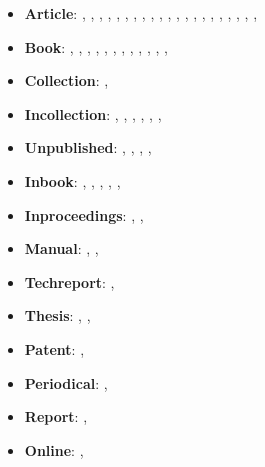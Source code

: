 \begin{itemize}
 \item \textbf{Article}: 
       \cite{brezis93:_leap},
       \cite{ishikawa94:cje},
       \cite{Biker-2007-unemployment},
       \cite{takeda12:cce},
       \cite{takeda07:jjie},
       \cite{yamazaki13:_japan},
       \cite{takeda10:irae},
       \cite{babiker05:ej},
       \cite{yamasue09:mt},
       \cite{yamasue07:mt},
       \cite{babiker00:ep},
       \cite{parry97:ree},
       \cite{takeda19:ere},
       \cite{takeda14:eeps},
       \cite{imbens19:reas},
       \cite{attwood06:_sexed_up},
       \cite{aksin20063027},
       \cite{baez/article},
       \cite{bohringer07:ecoe},
       \cite{bohringer06:ecoe},
       \cite{krugman79:jie},
 \item \textbf{Book}:
       \cite{krugman91:_geog},
       \cite{helpman91:_int},
       \cite{fujita99:_spatial},
       \cite{ryza15:_advan},
       \cite{pearl2009Causality},
       \cite{attwood09:_mains_sex},
       \cite{attwood10:_porn},
       \cite{jones84:_hb_int},
       \cite{jones85:_hb_int},
       \cite{jones97:_hb_int},
       \cite{aristotle:poetics},
       \cite{aristotle:physics},
       \cite{aristotle:anima}
 \item \textbf{Collection}:
       \cite{westfahl:frontier},
 \item \textbf{Incollection}:
       \cite{krugman91:_bila},
       \cite{lucas76:_critique},
       \cite{DeGorter2002},
       \cite{balistreri20131513},
       \cite{westfahl:space},
       \cite{Mcconnell2005},
 \item \textbf{Unpublished}:
       \cite{ishikawa03:_ghg},
       \cite{rutherford00:_gtap},
       \cite{takeda15:_lab},
       \cite{babiker99:_kyoto},
 \item \textbf{Inbook}:
       \cite{wong95:_int},
       \cite{milne-thomson68:_theor},
       \cite{kant:kpv},
       \cite{kant:ku},
       \cite{nietzsche:historie},
 \item \textbf{Inproceedings}:
       \cite{wang89:_model},
       \cite{zhang2016Deep},
 \item \textbf{Manual}:
       \cite{brooke03:_gams},
       \cite{cms},
 \item \textbf{Techreport}:
       \cite{Peri2007},
 \item \textbf{Thesis}:
       \cite{krugman77:_essay},
       \cite{loh},
 \item \textbf{Patent}:
       \cite{sorace},
 \item \textbf{Periodical}:
       \cite{jcg},
 \item \textbf{Report}:
       \cite{chiu},
 \item \textbf{Online}:
       \cite{ctan},
\end{itemize}


